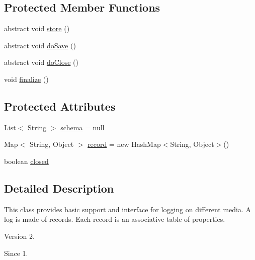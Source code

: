 \subsection*{Protected Member Functions}
\begin{DoxyCompactItemize}
\item 
abstract void \hyperlink{classjenes_1_1utils_1_1_abstract_logger_a6acf83a83999e26ae4ed45cbf355111b}{store} ()
\item 
abstract void \hyperlink{classjenes_1_1utils_1_1_abstract_logger_a41fcd50b050c467fe1b413fc5b49c167}{do\-Save} ()
\item 
abstract void \hyperlink{classjenes_1_1utils_1_1_abstract_logger_a5253672b3f3f81287db2fc604ca921a9}{do\-Close} ()
\item 
void \hyperlink{classjenes_1_1utils_1_1_abstract_logger_af2c45f653c6e5e79bc4e85dc3ecc4ab4}{finalize} ()
\end{DoxyCompactItemize}
\subsection*{Protected Attributes}
\begin{DoxyCompactItemize}
\item 
List$<$ String $>$ \hyperlink{classjenes_1_1utils_1_1_abstract_logger_a3a2030876857a0512fae7e0ad400c570}{schema} = null
\item 
Map$<$ String, Object $>$ \hyperlink{classjenes_1_1utils_1_1_abstract_logger_ae85e356ad12255a9c5ec8f9f25659ef7}{record} = new Hash\-Map$<$String, Object$>$()
\item 
boolean \hyperlink{classjenes_1_1utils_1_1_abstract_logger_a68fe91d1c7bad9146db3bddd92bbcab3}{closed}
\end{DoxyCompactItemize}


\subsection{Detailed Description}
This class provides basic support and interface for logging on different media. A log is made of records. Each record is an associative table of properties.

\begin{DoxyVersion}{Version}
2. 
\end{DoxyVersion}
\begin{DoxySince}{Since}
1. 
\end{DoxySince}


